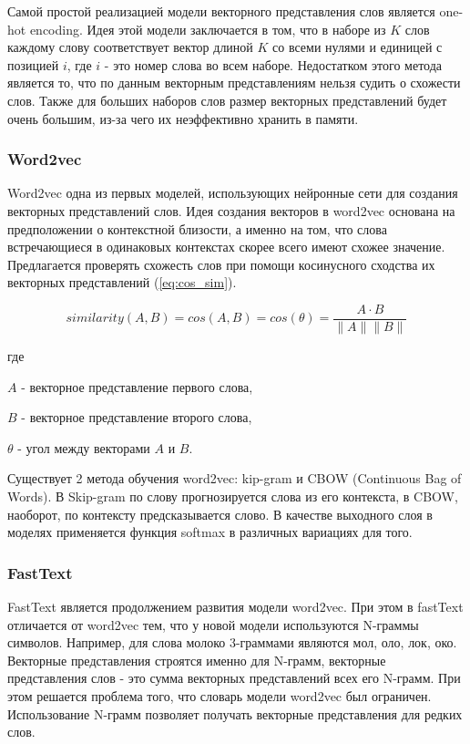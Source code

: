 \documentclass[a4paper,14pt]{article}
\begin{document}
	Самой простой реализацией модели векторного представления слов является one-hot encoding.
	Идея этой модели заключается в том, что в наборе из $K$ слов каждому слову соответствует вектор длиной $K$ со всеми нулями и единицей с позицией $i$, где $i$ - это номер слова во всем наборе.
	Недостатком этого метода является то, что по данным векторным представлениям нельзя судить о схожести слов.
	Также для больших наборов слов размер векторных представлений будет очень большим, из-за чего их неэффективно хранить в памяти.
	
	\subsubsection{Word2vec}
	
	Word2vec одна из первых моделей, использующих нейронные сети для создания векторных представлений слов.
	Идея создания векторов в word2vec основана на предположении о контекстной близости, а именно на том, что слова встречающиеся в одинаковых контекстах скорее всего имеют схожее значение.
	Предлагается проверять схожесть слов при помощи косинусного сходства их векторных представлений (\ref{eq:cos_sim}).
	
	\begin{equation}
		similarity(A,B) = cos(A,B) = cos(\theta) = \dfrac{A\cdot B}{\|A\| \|B\|}
		\label{eq:cos_sim}
	\end{equation}

	где
	
	$A$ - векторное представление первого слова,
	
	$B$ - векторное представление второго слова,
	
	$\theta$ - угол между векторами $A$ и $B$.
	
	Существует 2 метода обучения word2vec: kip-gram и CBOW (Continuous Bag of Words).
	В Skip-gram по слову прогнозируется слова из его контекста, в CBOW, наоборот, по контексту предсказывается слово.
	В качестве выходного слоя в моделях применяется функция softmax в различных вариациях для того.
		
	\subsubsection{FastText}
	
	FastText является продолжением развития модели word2vec.
	При этом в fastText отличается от word2vec тем, что у новой модели используются N-граммы символов.
	Например, для слова молоко 3-граммами являются мол, оло, лок, око.
	Векторные представления строятся именно для N-грамм, векторные представления слов - это сумма векторных представлений всех его N-грамм.
	При этом решается проблема того, что словарь модели word2vec был ограничен.
	Использование N-грамм позволяет получать векторные представления для редких слов.
	
\end{document}
